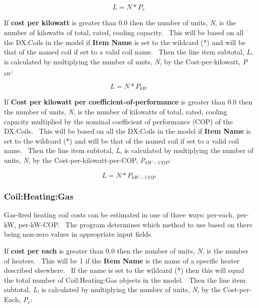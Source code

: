 \begin{equation}
L = N * {P_e}
\end{equation}

If \textbf{cost per kilowatt} is greater than 0.0 then the number of units, \emph{N}, is the number of kilowatts of total, rated, cooling capacity.~ This will be based on all the DX:Coils in the model if \textbf{Item Name} is set to the wildcard (*) and will be that of the named coil if set to a valid coil name.~ Then the line item subtotal, \emph{L}, is calculated by multiplying the number of units, \emph{N}, by the Cost-per-kilowatt, \emph{P\(_{kW}\)}:

\begin{equation}
L = N * {P_{kW}}
\end{equation}

If \textbf{Cost per kilowatt per coefficient-of-performance} is greater than 0.0 then the number of units, \emph{N}, is the number of kilowatts of total, rated, cooling capacity multiplied by the nominal coefficient of performance (COP) of the DX:Coils.~ This will be based on all the DX:Coils in the model if \textbf{Item Name} is set to the wildcard (*) and will be that of the named coil if set to a valid coil name.~ Then the line item subtotal, \emph{L}, is calculated by multiplying the number of units, \emph{N}, by the Cost-per-kilowatt-per-COP, \emph{P\(_{kW-COP}\)}:

\begin{equation}
L = N * {P_{kW - COP}}
\end{equation}

\subsubsection{Coil:Heating:Gas}\label{coilheatinggas}

Gas-fired heating coil costs can be estimated in one of three ways: per-each, per-kW, per-kW-COP.~ The program determines which method to use based on there being non-zero values in appropriate input fields.

If \textbf{cost per each} is greater than 0.0 then the number of units, \emph{N}, is the number of heaters.~ This will be 1 if the \textbf{Item Name} is the name of a specific heater described elsewhere.~ If the name is set to the wildcard (*) then this will equal the total number of Coil:Heating:Gas objects in the model.~ Then the line item subtotal, \emph{L}, is calculated by multiplying the number of units, \emph{N}, by the Cost-per-Each, \emph{P\(_{e}\)}:

